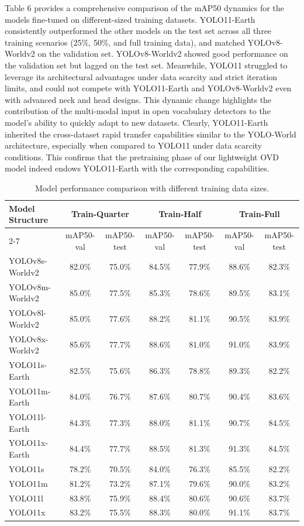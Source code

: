 \documentclass{article}
\begin{document}
Table 6 provides a comprehensive comparison of the mAP50 dynamics for the models fine-tuned on different-sized training datasets. YOLO11-Earth consistently outperformed the other models on the test set across all three training scenarios (25\%, 50\%, and full training data), and matched YOLOv8-Worldv2 on the validation set. YOLOv8-Worldv2 showed good performance on the validation set but lagged on the test set. Meanwhile, YOLO11 struggled to leverage its architectural advantages under data scarcity and strict iteration limits, and could not compete with YOLO11-Earth and YOLOv8-Worldv2 even with advanced neck and head designs. This dynamic change highlights the contribution of the multi-modal input in open vocabulary detectors to the model's ability to quickly adapt to new datasets. Clearly, YOLO11-Earth inherited the cross-dataset rapid transfer capabilities similar to the YOLO-World architecture, especially when compared to YOLO11 under data scarcity conditions. This confirms that the pretraining phase of our lightweight OVD model indeed endows YOLO11-Earth with the corresponding capabilities.

\begin{table}[ht]
\centering
\caption{Model performance comparison with different training data sizes.}
\begin{tabular}{lcccccc}
\toprule
\multirow{2}{*}{\textbf{Model Structure}} & \multicolumn{2}{c}{\textbf{Train-Quarter}} & \multicolumn{2}{c}{\textbf{Train-Half}} & \multicolumn{2}{c}{\textbf{Train-Full}} \\
\cmidrule(lr){2-7}
& mAP50-val & mAP50-test & mAP50-val & mAP50-test & mAP50-val & mAP50-test \\
\midrule
YOLOv8s-Worldv2 & 82.0\% & 75.0\% & 84.5\% & 77.9\% & 88.6\% & 82.3\% \\
YOLOv8m-Worldv2 & 85.0\% & 77.5\% & 85.3\% & 78.6\% & 89.5\% & 83.1\% \\
YOLOv8l-Worldv2 & 85.0\% & 77.6\% & 88.2\% & 81.1\% & 90.5\% & 83.9\% \\
YOLOv8x-Worldv2 & 85.6\% & 77.7\% & 88.6\% & 81.0\% & 91.0\% & 83.9\% \\
\midrule
YOLO11s-Earth   & 82.5\% & 75.6\% & 86.3\% & 78.8\% & 89.3\% & 82.2\% \\
YOLO11m-Earth   & 84.0\% & 76.7\% & 87.6\% & 80.7\% & 90.4\% & 83.6\% \\
YOLO11l-Earth   & 84.3\% & 77.3\% & 88.0\% & 81.1\% & 90.7\% & 84.5\% \\
YOLO11x-Earth   & 84.4\% & 77.7\% & 88.5\% & 81.3\% & 91.3\% & 84.5\% \\
\midrule
YOLO11s         & 78.2\% & 70.5\% & 84.0\% & 76.3\% & 85.5\% & 82.2\% \\
YOLO11m         & 81.2\% & 73.2\% & 87.1\% & 79.6\% & 90.0\% & 83.2\% \\
YOLO11l         & 83.8\% & 75.9\% & 88.4\% & 80.6\% & 90.6\% & 83.7\% \\
YOLO11x         & 83.2\% & 75.5\% & 88.3\% & 80.0\% & 91.1\% & 83.7\% \\
\bottomrule
\end{tabular}
\end{table}
\end{document}
